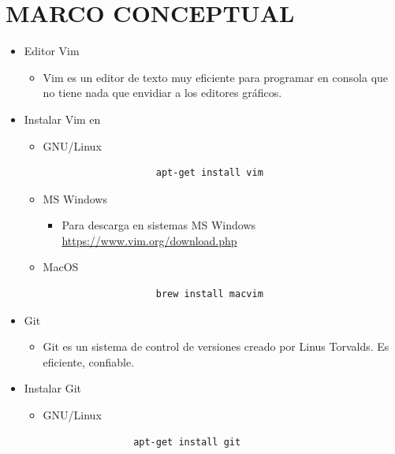 \documentclass{article}
\begin{document}
	\section{MARCO CONCEPTUAL}
	\begin{itemize}
		\item Editor Vim
        \begin{itemize}
            \item Vim es un editor de texto muy eficiente para programar en consola que no tiene nada que envidiar a los editores gráficos.
        \end{itemize}
        \item Instalar Vim en
        \begin{itemize}
            \item GNU/Linux
            \begin{itemize}
                \begin{verbatim}
                    apt-get install vim
                \end{verbatim}
            \end{itemize}
            \item MS Windows
            \begin{itemize}
                \item Para descarga en sistemas MS Windows \url{https://www.vim.org/download.php}
            \end{itemize}
            \item MacOS
            \begin{itemize}
                \begin{lstlisting}
                    brew install macvim
                \end{lstlisting}
            \end{itemize}
        \end{itemize}
        \item Git
        \begin{itemize}
            \item Git es un sistema de control de versiones creado por Linus Torvalds. Es eficiente, confiable.
        \end{itemize}
        \item Instalar Git
        \begin{itemize}
            \item GNU/Linux
            \begin{itemize}
                \begin{lstlisting}
                apt-get install git    

\end{lstlisting}
\end{itemize}
\end{itemize}
\end{itemize}
\end{document}
